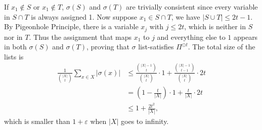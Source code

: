 \documentclass[10pt,a4paper]{article}
\begin{document}
    If $x_1 \notin S$ or $x_1 \notin T$, $\sigma(S)$ and $\sigma(T)$ are trivially consistent since every variable in $S \cap T$ is always assigned 1. Now suppose $x_1 \in S\cap T$, we have $|S \cup T| \le 2t-1$. By Pigeonhole Principle, there is a variable $x_j$ with $j \le 2t$, which is neither in $S$ nor in $T$. Thus the assignment that maps $x_1$ to $j$ and everything else to $1$ appears in both $\sigma(S)$ and $\sigma(T)$, proving that $\sigma$ list-satisfies $\Pi^{\odot t}$. The total size of the lists is \[
    \begin{aligned}
        \frac{1}{\binom{|X|}{t}}\sum_{x \in X} |\sigma(x)| & \le \frac{\binom{|X|-1}{t}}{\binom{|X|}{t}}\cdot 1+\frac{\binom{|X|-1}{t-1}}{\binom{|X|}{t}}\cdot 2t \\ 
        & = \left(1-\frac{t}{|X|}\right)\cdot 1+\frac{t}{|X|}\cdot 2t \\
        & \le 1+\frac{2t^2}{|X|},
    \end{aligned}\]
    which is smaller than $1+\varepsilon$ when $|X|$ goes to infinity.
    
\end{document}
